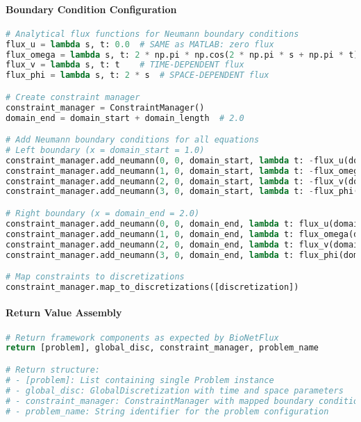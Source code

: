 \paragraph{Boundary Condition Configuration}
\begin{lstlisting}[language=Python, caption=Python Boundary Condition Setup]
# Analytical flux functions for Neumann boundary conditions
flux_u = lambda s, t: 0.0  # SAME as MATLAB: zero flux
flux_omega = lambda s, t: 2 * np.pi * np.cos(2 * np.pi * s + np.pi * t)  # NON-ZERO
flux_v = lambda s, t: t    # TIME-DEPENDENT flux  
flux_phi = lambda s, t: 2 * s  # SPACE-DEPENDENT flux

# Create constraint manager
constraint_manager = ConstraintManager()
domain_end = domain_start + domain_length  # 2.0

# Add Neumann boundary conditions for all equations
# Left boundary (x = domain_start = 1.0)
constraint_manager.add_neumann(0, 0, domain_start, lambda t: -flux_u(domain_start, t))
constraint_manager.add_neumann(1, 0, domain_start, lambda t: -flux_omega(domain_start, t))
constraint_manager.add_neumann(2, 0, domain_start, lambda t: -flux_v(domain_start, t))
constraint_manager.add_neumann(3, 0, domain_start, lambda t: -flux_phi(domain_start, t))

# Right boundary (x = domain_end = 2.0)  
constraint_manager.add_neumann(0, 0, domain_end, lambda t: flux_u(domain_end, t))
constraint_manager.add_neumann(1, 0, domain_end, lambda t: flux_omega(domain_end, t))
constraint_manager.add_neumann(2, 0, domain_end, lambda t: flux_v(domain_end, t))
constraint_manager.add_neumann(3, 0, domain_end, lambda t: flux_phi(domain_end, t))

# Map constraints to discretizations
constraint_manager.map_to_discretizations([discretization])
\end{lstlisting}

\paragraph{Return Value Assembly}
\begin{lstlisting}[language=Python, caption=create\_global\_framework Return]
# Return framework components as expected by BioNetFlux
return [problem], global_disc, constraint_manager, problem_name

# Return structure:
# - [problem]: List containing single Problem instance
# - global_disc: GlobalDiscretization with time and space parameters  
# - constraint_manager: ConstraintManager with mapped boundary conditions
# - problem_name: String identifier for the problem configuration
\end{lstlisting}

